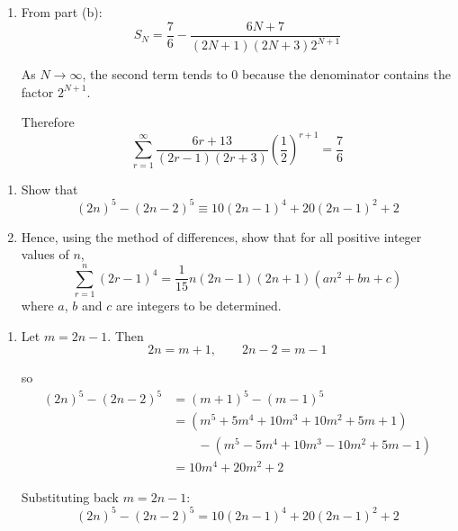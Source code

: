 \documentclass[leqno]{article}
\begin{document}
\begin{enumerate}[
  label=\textbf{\arabic*.},
  leftmargin=*,
  topsep=0pt,
  partopsep=0pt,
  parsep=0pt
]
\begin{djsSolution}
\begin{enumerate}[label=\textbf{(\alph*)}]
Hence
\[
\sum_{r=1}^{N} \frac{6r+13}{(2r-1)(2r+3)}\left(\frac12\right)^{r+1}
=\frac76-\frac{1}{(2N+1)2^N}-\frac{1}{(2N+3)2^{N+1}}
\]

or equivalently
\[
\sum_{r=1}^{N} \frac{6r+13}{(2r-1)(2r+3)}\left(\frac12\right)^{r+1}
=\frac76-\frac{6N+7}{(2N+1)(2N+3)2^{N+1}}
\]

  \item From part (b):
\[
S_N=\frac76-\frac{6N+7}{(2N+1)(2N+3)2^{N+1}}
\]

As \(N\to\infty\), the second term tends to \(0\) because the denominator contains the factor \(2^{N+1}\).

Therefore
\[
\sum_{r=1}^{\infty} \frac{6r+13}{(2r-1)(2r+3)}\left(\frac12\right)^{r+1}
=\frac76
\]
\end{enumerate}
\end{djsSolution}


\newpage

\questionitem

\begin{enumerate}[label=\textbf{(\alph*)}]
  \item Show that
  \[
  (2n)^5-(2n-2)^5 \equiv 10(2n-1)^4+20(2n-1)^2+2
  \]
  \item Hence, using the method of differences, show that for all positive integer values of $n$,
  \[
  \sum_{r=1}^{n}(2r-1)^4=\frac{1}{15}n(2n-1)(2n+1)(an^2+bn+c)
  \]
  where $a$, $b$ and $c$ are integers to be determined.  \\
\end{enumerate}

\vspace*{10pt}

\begin{djsSolution}
\begin{enumerate}[label=\textbf{(\alph*)}]
  \item Let \(m=2n-1\). Then
\[
2n=m+1,\qquad 2n-2=m-1
\]

so
\begin{align*}
(2n)^5-(2n-2)^5
&=(m+1)^5-(m-1)^5\\
&=\left(m^5+5m^4+10m^3+10m^2+5m+1\right)\\
&\qquad-\left(m^5-5m^4+10m^3-10m^2+5m-1\right)\\
&=10m^4+20m^2+2
\end{align*}

Substituting back \(m=2n-1\):
\[
(2n)^5-(2n-2)^5=10(2n-1)^4+20(2n-1)^2+2
\]


\end{enumerate}
\end{djsSolution}
\end{enumerate}
\end{document}
